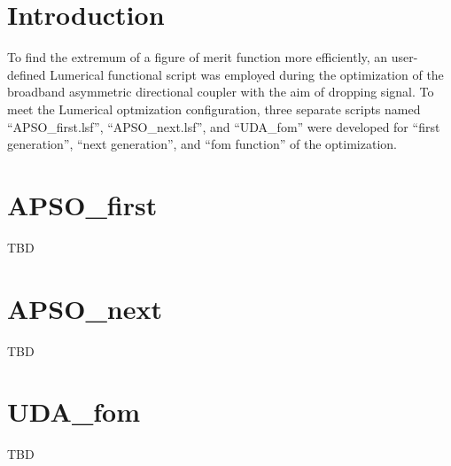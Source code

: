 
\section{Introduction}
    To find the extremum of a figure of merit function more efficiently, 
    an user-defined Lumerical functional script was employed during the optimization of the 
    broadband asymmetric directional coupler with the aim of dropping signal. 
    To meet the Lumerical optmization configuration, 
    three separate scripts named ``APSO\_first.lsf'', ``APSO\_next.lsf'', and ``UDA\_fom'' were developed 
    for ``first generation'', ``next generation'', and ``fom function'' of the optimization. 
\section{APSO\_first}
    TBD
\section{APSO\_next}
    TBD
\section{UDA\_fom}
    TBD